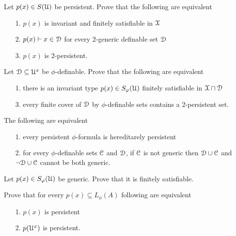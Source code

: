 \begin{exercise}  
  Let $p(x)\in S(\EuScript U)$ be persistent.
  Prove that the following are equivalent
  \begin{itemize}
    \item[1.] $p(x)$ is invariant and finitely satisfiable in $\EuScript X$
    \item[2.] $p(x)\vdash x\in\EuScript D$ for every 2-generic definable set $\EuScript D$
    \item[3.] $p(x)$ is 2-persistent.
  \end{itemize}
\end{exercise}

\begin{exercise}  
  Let $\EuScript D\subseteq\EuScript U^x$ be $\phi$-definable.
  Prove that the following are equivalent 
  \begin{itemize}
    \item[1.] there is an invariant type $p(x)\in S_\varphi(\EuScript U)$ finitely satisfiable in $\EuScript X\cap\EuScript D$
    \item[3.] every finite cover of $\EuScript D$ by $\phi$-definable sets contains a 2-persistent set.
  \end{itemize}
\end{exercise}

\begin{exercise}  
  The following are equivalent
  \begin{itemize}
    \item[1.] every persistent $\phi$-formula is hereditarely persistent
    \item[2.] for every $\phi$-definable sets $\EuScript C$ and $\EuScript D$, if $\EuScript C$ is not generic then $\EuScript D\cup\EuScript C$ and $\neg\EuScript D\cup\EuScript C$ cannot be both generic.
  \end{itemize}
\end{exercise}

\begin{exercise}\label{ex_gen_sat}
  Let $p(x)\in S_\varphi(\EuScript U)$ be generic.
  Prove that it is finitely satisfiable.
\end{exercise}

\begin{exercise}\label{ex_persistent_types}
  Prove that for every $p(x)\subseteq L_\phi(A)$ following are equivalent
  \begin{itemize}
    \item[1.] $p(x)$ is persistent
    \item[2.] $p(\EuScript U^x)$ is persistent.
  \end{itemize}
\end{exercise}

